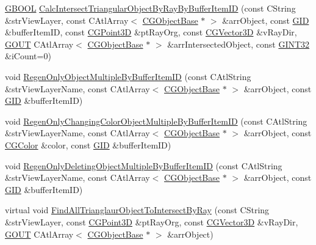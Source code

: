\begin{DoxyCompactItemize}
\hyperlink{_g_types_8h_a2901915743626352a6820c5405f556dc}{G\+B\+O\+O\+L} \hyperlink{class_c_g3_d_view_a832d39ba4e049aa05de00c6071afa88e}{Calc\+Intersect\+Triangular\+Object\+By\+Ray\+By\+Buffer\+Item\+I\+D} (const C\+String \&str\+View\+Layer, const C\+Atl\+Array$<$ \hyperlink{class_c_g_object_base}{C\+G\+Object\+Base} $\ast$ $>$ \&arr\+Object, const \hyperlink{_g_types_8h_a5b96ecb16d8e437977d12cd40aa6f6d8}{G\+I\+D} \&buffer\+Item\+I\+D, const \hyperlink{class_c_g_point3_d}{C\+G\+Point3\+D} \&pt\+Ray\+Org, const \hyperlink{_g_point3_d_8h_aa7e73d39f4c991acb5a13c84b498366d}{C\+G\+Vector3\+D} \&v\+Ray\+Dir, \hyperlink{_g_types_8h_a0858ec221262e635612871d70ca233ad}{G\+O\+U\+T} C\+Atl\+Array$<$ \hyperlink{class_c_g_object_base}{C\+G\+Object\+Base} $\ast$ $>$ \&arr\+Intersected\+Object, const \hyperlink{_g_types_8h_a40d8bc7c06b9e72906852691a4bf888e}{G\+I\+N\+T32} \&i\+Count=0)
\item 
void \hyperlink{class_c_g3_d_view_aac23e07352ca4a01687f8ab9c4307810}{Regen\+Only\+Object\+Multiple\+By\+Buffer\+Item\+I\+D} (const C\+Atl\+String \&str\+View\+Layer\+Name, const C\+Atl\+Array$<$ \hyperlink{class_c_g_object_base}{C\+G\+Object\+Base} $\ast$ $>$ \&arr\+Object, const \hyperlink{_g_types_8h_a5b96ecb16d8e437977d12cd40aa6f6d8}{G\+I\+D} \&buffer\+Item\+I\+D)
\item 
void \hyperlink{class_c_g3_d_view_ab3c9663c0d5168c24f09752e5904cc64}{Regen\+Only\+Changing\+Color\+Object\+Multiple\+By\+Buffer\+Item\+I\+D} (const C\+Atl\+String \&str\+View\+Layer\+Name, const C\+Atl\+Array$<$ \hyperlink{class_c_g_object_base}{C\+G\+Object\+Base} $\ast$ $>$ \&arr\+Object, const \hyperlink{class_c_g_color}{C\+G\+Color} \&color, const \hyperlink{_g_types_8h_a5b96ecb16d8e437977d12cd40aa6f6d8}{G\+I\+D} \&buffer\+Item\+I\+D)
\item 
void \hyperlink{class_c_g3_d_view_a9c9d5aa33edb18d9d4bab97df99e0ff4}{Regen\+Only\+Deleting\+Object\+Multiple\+By\+Buffer\+Item\+I\+D} (const C\+Atl\+String \&str\+View\+Layer\+Name, const C\+Atl\+Array$<$ \hyperlink{class_c_g_object_base}{C\+G\+Object\+Base} $\ast$ $>$ \&arr\+Object, const \hyperlink{_g_types_8h_a5b96ecb16d8e437977d12cd40aa6f6d8}{G\+I\+D} \&buffer\+Item\+I\+D)
\item 
virtual void \hyperlink{class_c_g3_d_view_af50e42c0632c49633dc9d9a053c422d1}{Find\+All\+Trianglaur\+Object\+To\+Intersect\+By\+Ray} (const C\+String \&str\+View\+Layer, const \hyperlink{class_c_g_point3_d}{C\+G\+Point3\+D} \&pt\+Ray\+Org, const \hyperlink{_g_point3_d_8h_aa7e73d39f4c991acb5a13c84b498366d}{C\+G\+Vector3\+D} \&v\+Ray\+Dir, \hyperlink{_g_types_8h_a0858ec221262e635612871d70ca233ad}{G\+O\+U\+T} C\+Atl\+Array$<$ \hyperlink{class_c_g_object_base}{C\+G\+Object\+Base} $\ast$ $>$ \&arr\+Object)

\end{DoxyCompactItemize}
